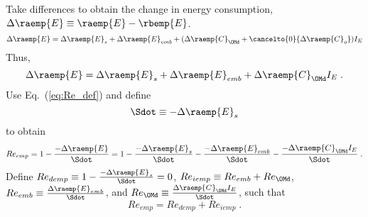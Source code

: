 \begin{landscape}
{Take differences to obtain the change in energy consumption, $\Delta \raemp{E} \equiv \raemp{E} - \rbemp{E}$.
%
\begin{equation}
  \Delta \raemp{E} = \Delta \raemp{E}_s
                     + \Delta \raemp{E}_{emb}
                     + (\Delta \raemp{C}_{\OMd}
                     + \cancelto{0}{\Delta \raemp{C}_o}) I_E
\end{equation}
%
Thus, 
%
\begin{equation}
\Delta \raemp{E} = \Delta \raemp{E}_s + \Delta \raemp{E}_{emb} + \Delta \raemp{C}_{\OMd} I_E \; .
\end{equation}
%
Use Eq.~(\ref{eq:Re_def}) and define
%
\begin{equation} \label{eq:Sdot_def}
\Sdot \equiv -\Delta \raemp{E}_s
\end{equation}
%
to obtain
%
\begin{equation}
Re_{emp} = 1 - \frac{-\Delta \raemp{E}}{\Sdot} 
         = 1 - \frac{-\Delta \raemp{E}_s}{\Sdot} 
             - \frac{-\Delta \raemp{E}_{emb}}{\Sdot}
             - \frac{-\Delta \raemp{C}_{\OMd} I_E}{\Sdot} \; .
\end{equation}
%
Define $Re_{demp} \equiv 1 - \frac{-\Delta \raemp{E}_s}{\Sdot} = 0$, 
$Re_{iemp} \equiv Re_{emb} + Re_{\OMd}$, 
$Re_{emb} \equiv \frac{\Delta \raemp{E}_{emb}}{\Sdot}$, and
$Re_{\OMd} \equiv \frac{\Delta \raemp{C}_{\OMd} I_E}{\Sdot}$, 
such that
%
\begin{equation}
Re_{emp} = Re_{demp} + Re_{iemp} \; .
\end{equation}
}
{
~
    
}
\end{landscape}
